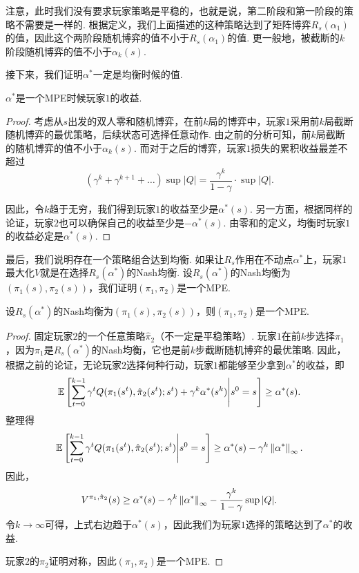 注意，此时我们没有要求玩家策略是平稳的，也就是说，第二阶段和第一阶段的策略不需要是一样的. 根据定义，我们上面描述的这种策略达到了矩阵博弈$R_s(\alpha_1)$的值，因此这个两阶段随机博弈的值不小于$R_s(\alpha_1)$的值. 更一般地，被截断的$k$阶段随机博弈的值不小于$\alpha_{k}(s)$. 

接下来，我们证明$\alpha^*$一定是均衡时候的值. 

\begin{lemma}
    $\alpha^*$是一个MPE时候玩家$1$的收益. 
\end{lemma}
\begin{proof}
考虑从$s$出发的双人零和随机博弈，在前$k$局的博弈中，玩家$1$采用前$k$局截断随机博弈的最优策略，后续状态可选择任意动作. 由之前的分析可知，前$k$局截断的随机博弈的值不小于$\alpha_k(s)$. 而对于之后的博弈，玩家$1$损失的累积收益最差不超过
\[(\gamma^k+\gamma^{k+1}+\dots)\sup|Q|=\frac{\gamma^k}{1-\gamma}\cdot \sup|Q|.\]

因此，令$k$趋于无穷，我们得到玩家$1$的收益至少是$\alpha^*(s)$. 另一方面，根据同样的论证，玩家$2$也可以确保自己的收益至少是$-\alpha^*(s)$. 由零和的定义，均衡时玩家$1$的收益必定是$\alpha^*(s)$. 
\end{proof}

最后，我们说明存在一个策略组合达到均衡. 如果让$R_s$作用在不动点$\alpha^*$上，玩家$1$最大化$V$就是在选择$R_s(\alpha^*)$的Nash均衡. 设$R_s(\alpha^*)$的Nash均衡为$(\pi_1(s),\pi_2(s))$，我们证明$(\pi_1,\pi_2)$是一个MPE. 

\begin{lemma}
    设$R_s(\alpha^*)$的Nash均衡为$(\pi_1(s),\pi_2(s))$，则$(\pi_1,\pi_2)$是一个MPE.
\end{lemma}

\begin{proof}
固定玩家$2$的一个任意策略$\hat{\pi}_2$（不一定是平稳策略）. 玩家$1$在前$k$步选择$\pi_1$，因为$\pi_1$是$R_s(\alpha^*)$的Nash均衡，它也是前$k$步截断随机博弈的最优策略. 因此，根据之前的论证，无论玩家$2$选择何种行动，玩家$1$都能够至少拿到$\alpha^*$的收益，即
\[\mathbb{E}\left[\sum_{t=0}^{k-1}\gamma^tQ(\pi_1(s^t),\hat{\pi}_2(s^t);s^t)+\gamma^k\alpha^*(s^k)\middle|s^0=s\right]\ge \alpha^*(s).\]
整理得
\[\mathbb{E}\left[\sum_{t=0}^{k-1}\gamma^tQ(\pi_1(s^t),\hat{\pi}_2(s^t);s^t)\middle|s^0=s\right]\ge \alpha^*(s)-\gamma^k\left\|\alpha^*\right\|_\infty.\]
因此，
\[V^{\pi_1,\hat{\pi}_2}(s)\ge \alpha^*(s) - \gamma^k\left\|\alpha^*\right\|_\infty - \frac{\gamma^k}{1-\gamma}\sup|Q|.\]
令$k\to\infty$可得，上式右边趋于$\alpha^*(s)$，因此我们为玩家$1$选择的策略达到了$\alpha^*$的收益. 

玩家$2$的$\pi_2$证明对称，因此$(\pi_1,\pi_2)$是一个MPE.
\end{proof}

